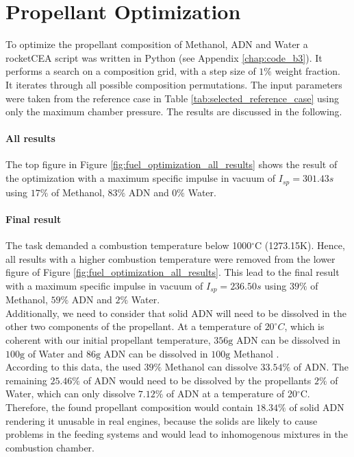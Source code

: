 \documentclass[12pt]{article}
\begin{document}
\section{Propellant Optimization}
\label{chap:task_b3}
To optimize the propellant composition of Methanol, ADN and Water a rocketCEA script was written in Python (see Appendix \ref{chap:code_b3}). It performs a search on a composition grid, with a step size of $1\%$ weight fraction. It iterates through all possible composition permutations. The input parameters were taken from the reference case in Table \ref{tab:selected_reference_case} using only the maximum chamber pressure. The results are discussed in the following.

\paragraph{All results}
The top figure in Figure \ref{fig:fuel_optimization_all_results} shows the result of the optimization with a maximum specific impulse in vacuum of $I_{sp}=301.43s$ using $17\%$ of Methanol, $83\%$ ADN and $0\%$ Water.

\paragraph{Final result}
The task demanded a combustion temperature below 1000$^\circ$C (1273.15K). Hence, all results with a higher combustion temperature were removed from the lower figure of Figure \ref{fig:fuel_optimization_all_results}. This lead to the final result with a maximum specific impulse in vacuum of $I_{sp}=236.50s$ using $39\%$ of Methanol, $59\%$ ADN and $2\%$ Water.\\

Additionally, we need to consider that solid ADN will need to be dissolved in the other two components of the propellant. At a temperature of $20^\circ C$, which is coherent with our initial propellant temperature, $356\text{g}$ ADN can be dissolved in $100\text{g}$ of Water and $86\text{g}$ ADN can be dissolved in $100\text{g}$ Methanol \cite{Larsson2011}.\\

According to this data, the used $39\%$ Methanol can dissolve $33.54\%$ of ADN. The remaining $25.46\%$ of ADN would need to be dissolved by the propellants $2\%$ of Water, which can only dissolve $7.12\%$ of ADN at a temperature of 20$^\circ$C. Therefore, the found propellant composition would contain $18.34\%$ of solid ADN rendering it unusable in real engines, because the solids are likely to cause problems in the feeding systems and would lead to inhomogenous mixtures in the combustion chamber.\\
\end{document}
